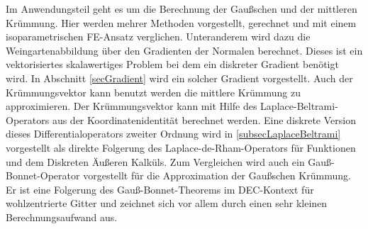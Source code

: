 Im Anwendungsteil geht es um die Berechnung der Gaußschen und der mittleren Krümmung.
Hier werden mehrer Methoden vorgestellt, gerechnet und mit einem isoparametrischen FE-Ansatz verglichen.
Unteranderem wird dazu die Weingartenabbildung über den Gradienten der Normalen berechnet.
Dieses ist ein vektorisiertes skalawertiges Problem bei dem ein diskreter Gradient benötigt wird.
In Abschnitt \ref{secGradient} wird ein solcher Gradient vorgestellt.
Auch der Krümmungsvektor kann benutzt werden die mittlere Krümmung zu approximieren.
Der Krümmungsvektor kann mit Hilfe des Laplace-Beltrami-Operators aus der Koordinatenidentität berechnet werden.
Eine diskrete Version dieses Differentialoperators zweiter Ordnung wird in \ref{subsecLaplaceBeltrami} vorgestellt als direkte Folgerung
des Laplace-de-Rham-Operators für Funktionen und dem Diskreten Äußeren Kalküls.
Zum Vergleichen wird auch ein Gauß-Bonnet-Operator vorgestellt für die Approximation der Gaußschen Krümmung.
Er ist eine Folgerung des Gauß-Bonnet-Theorems im DEC-Kontext für wohlzentrierte Gitter und zeichnet sich vor allem durch einen sehr kleinen Berechnungsaufwand aus.
